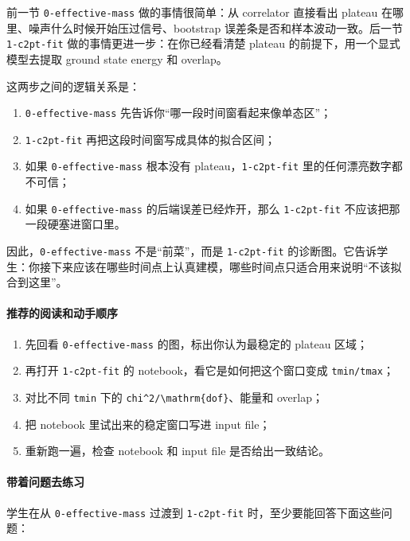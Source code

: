 \documentclass[11pt,a4paper,fontset=fandol]{ctexart}
\begin{document}
前一节 \lstinline|0-effective-mass| 做的事情很简单：从 correlator 直接看出 plateau 在哪里、噪声什么时候开始压过信号、bootstrap 误差条是否和样本波动一致。后一节 \lstinline|1-c2pt-fit| 做的事情更进一步：在你已经看清楚 plateau 的前提下，用一个显式模型去提取 ground state energy 和 overlap。

这两步之间的逻辑关系是：

\begin{enumerate}[leftmargin=2em]
  \item \lstinline|0-effective-mass| 先告诉你“哪一段时间窗看起来像单态区”；
  \item \lstinline|1-c2pt-fit| 再把这段时间窗写成具体的拟合区间；
  \item 如果 \lstinline|0-effective-mass| 根本没有 plateau，\lstinline|1-c2pt-fit| 里的任何漂亮数字都不可信；
  \item 如果 \lstinline|0-effective-mass| 的后端误差已经炸开，那么 \lstinline|1-c2pt-fit| 不应该把那一段硬塞进窗口里。
\end{enumerate}

因此，\lstinline|0-effective-mass| 不是“前菜”，而是 \lstinline|1-c2pt-fit| 的诊断图。它告诉学生：你接下来应该在哪些时间点上认真建模，哪些时间点只适合用来说明“不该拟合到这里”。

\paragraph{推荐的阅读和动手顺序}

\begin{enumerate}[leftmargin=2em]
  \item 先回看 \lstinline|0-effective-mass| 的图，标出你认为最稳定的 plateau 区域；
  \item 再打开 \lstinline|1-c2pt-fit| 的 notebook，看它是如何把这个窗口变成 \lstinline|tmin/tmax|；
  \item 对比不同 \lstinline|tmin| 下的 \lstinline|chi^2/\mathrm{dof}|、能量和 overlap；
  \item 把 notebook 里试出来的稳定窗口写进 input file；
  \item 重新跑一遍，检查 notebook 和 input file 是否给出一致结论。
\end{enumerate}

\paragraph{带着问题去练习}

学生在从 \lstinline|0-effective-mass| 过渡到 \lstinline|1-c2pt-fit| 时，至少要能回答下面这些问题：
\end{document}
